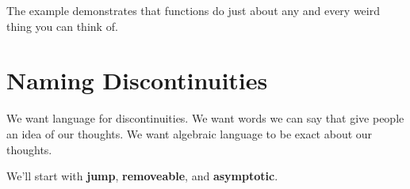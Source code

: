 \documentclass{ximera}
\begin{document}
The example demonstrates that functions do just about any and every weird thing you can think of.













\section*{Naming Discontinuities}



We want language for discontinuities.  We want words we can say that give people an idea of our thoughts. We want algebraic language to be exact about our thoughts.


We'll start with \textbf{jump}, \textbf{removeable}, and \textbf{asymptotic}.
\end{document}
